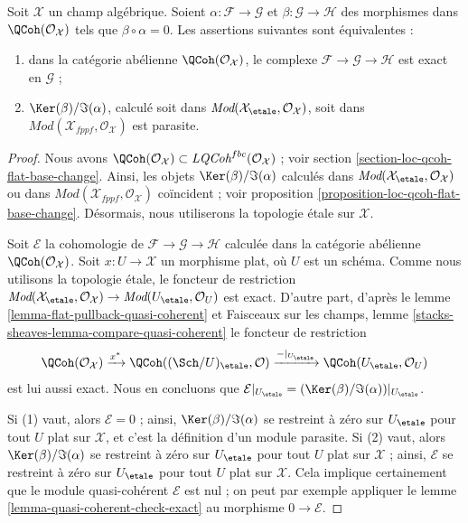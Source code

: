 \begin{lemma}
\label{lemma-exact-sequence-quasi-coherent-parasitic-cohomology}
Soit $\mathcal{X}$ un champ algébrique. Soient
$\alpha : \mathcal{F} \to \mathcal{G}$ et
$\beta : \mathcal{G} \to \mathcal{H}$
des morphismes dans $\QCoh(\mathcal{O}_\mathcal{X})$ tels que
$\beta \circ \alpha = 0$. Les assertions suivantes sont équivalentes :
\begin{enumerate}
\item dans la catégorie abélienne $\QCoh(\mathcal{O}_\mathcal{X})$,
le complexe $\mathcal{F} \to \mathcal{G} \to \mathcal{H}$
est exact en $\mathcal{G}$ ;
\item $\Ker(\beta)/\Im(\alpha)$, calculé soit dans
$\textit{Mod}(\mathcal{X}_\etale, \mathcal{O}_\mathcal{X})$, soit dans
$\textit{Mod}(\mathcal{X}_{fppf}, \mathcal{O}_\mathcal{X})$
est parasite.
\end{enumerate}
\end{lemma}

\begin{proof}
Nous avons $\QCoh(\mathcal{O}_\mathcal{X}) \subset
\textit{LQCoh}^{fbc}(\mathcal{O}_\mathcal{X})$ ; voir
section \ref{section-loc-qcoh-flat-base-change}.
Ainsi, les objets $\Ker(\beta)/\Im(\alpha)$ calculés dans
$\textit{Mod}(\mathcal{X}_\etale, \mathcal{O}_\mathcal{X})$ ou dans
$\textit{Mod}(\mathcal{X}_{fppf}, \mathcal{O}_\mathcal{X})$ coïncident ; voir
proposition \ref{proposition-loc-qcoh-flat-base-change}.
Désormais, nous utiliserons la topologie étale sur $\mathcal{X}$.

\medskip\noindent
Soit $\mathcal{E}$ la cohomologie de
$\mathcal{F} \to \mathcal{G} \to \mathcal{H}$
calculée dans la catégorie abélienne $\QCoh(\mathcal{O}_\mathcal{X})$.
Soit $x : U \to \mathcal{X}$ un morphisme plat, où $U$ est un schéma.
Comme nous utilisons la topologie étale, le foncteur de restriction
$\textit{Mod}(\mathcal{X}_\etale, \mathcal{O}_\mathcal{X})
\to \textit{Mod}(U_\etale, \mathcal{O}_U)$ est exact.
D'autre part, d'après le lemme \ref{lemma-flat-pullback-quasi-coherent} et
Faisceaux sur les champs, lemme \ref{stacks-sheaves-lemma-compare-quasi-coherent}
le foncteur de restriction
$$
\QCoh(\mathcal{O}_\mathcal{X}) \xrightarrow{x^*}
\QCoh((\Sch/U)_\etale, \mathcal{O}) \xrightarrow{{-}|_{U_\etale}}
\QCoh(U_\etale, \mathcal{O}_U)
$$
est lui aussi exact. Nous en concluons que
$\mathcal{E}|_{U_\etale} = (\Ker(\beta)/\Im(\alpha))|_{U_\etale}$.

\medskip\noindent
Si (1) vaut, alors $\mathcal{E} = 0$ ; ainsi, $\Ker(\beta)/\Im(\alpha)$
se restreint à zéro sur $U_\etale$ pour tout $U$ plat sur $\mathcal{X}$, et c'est
la définition d'un module parasite. Si (2) vaut, alors
$\Ker(\beta)/\Im(\alpha)$ se restreint à zéro sur $U_\etale$ pour tout $U$
plat sur $\mathcal{X}$ ; ainsi, $\mathcal{E}$ se restreint à zéro sur
$U_\etale$ pour tout $U$ plat sur $\mathcal{X}$. Cela implique certainement
que le module quasi-cohérent $\mathcal{E}$ est nul ; on peut par exemple appliquer le
lemme \ref{lemma-quasi-coherent-check-exact}
au morphisme $0 \to \mathcal{E}$.
\end{proof}





